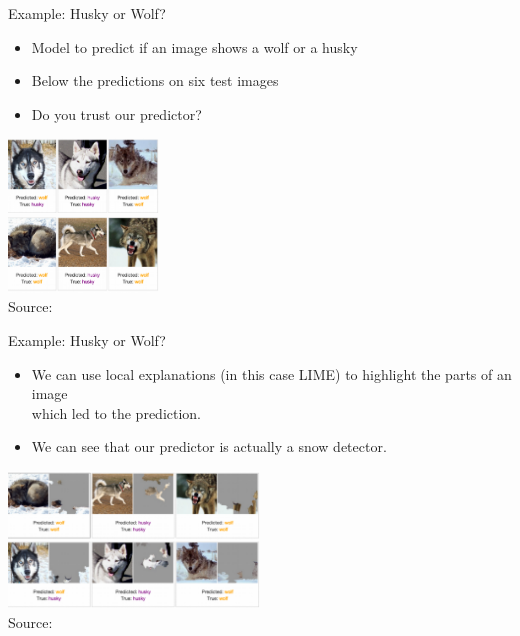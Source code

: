 \documentclass[aspectratio=169]{../latex_main/tntbeamer}  %
\begin{document}
\begin{frame}{Example: Husky or Wolf?}
	\begin{itemize}
		\item Model to predict if an image shows a wolf or a husky
		\item Below the predictions on six test images 
		\item Do you trust our predictor? 
	\end{itemize}
	\begin{center}
		\includegraphics[width=0.3\textwidth]{figure/lime-wolfhusky.png}\\
		\includegraphics[width=0.3\textwidth]{figure/lime-wolfhusky2.png}\\
		{Source: }
	\end{center}

\end{frame}
\begin{frame}{Example: Husky or Wolf?}
	
	\begin{itemize}
		\item We can use local explanations (in this case LIME) to highlight the parts of an image\\ which led to the prediction.
		\item We can see that our predictor is actually a snow detector. 
	\end{itemize}
	\begin{center}
		\includegraphics[width=0.5\textwidth]{figure/lime-wolfhusky3.png}\\
		{ Source: }
	\end{center}
\end{frame}
\end{document}
